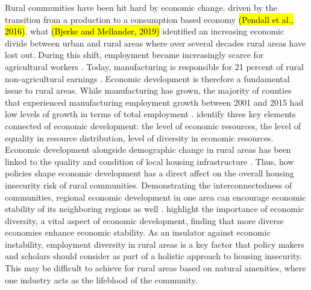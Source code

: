 Rural communities have been hit hard by economic change, driven by the transition from a production to a consumption based economy \hl{(Pendall et al., 2016)}. what \hl{(Bjerke and Mellander, 2019)} identified an increasing economic divide between urban and rural areas where over several decades rural areas have lost out. During this shift, employment became increasingly scarce for agricultural workers \citep{kropczynski_insights_2012}. Today, manufacturing is responsible for 21 percent of rural non-agricultural earnings \citep{low_rural_2017}. Economic development is therefore a fundamental issue to rural areas. While manufacturing has grown, the majority of counties that experienced manufacturing employment growth between 2001 and 2015 had low levels of growth in terms of total employment \citep{low_rural_2017}. \citet{sherrieb_measuring_2010} identify three key elements connected of economic development: the level of economic resources, the level of equality in resource distribution, level of diversity in economic resources. Economic development alongside demographic change in rural areas has been linked to the quality and condition of local housing infrastructure \citep{barcus_heterogeneity_2011}. Thus, how policies shape economic development has a direct affect on the overall housing insecurity risk of rural communities. Demonstrating the interconnectedness of communities, regional economic development in one area can encourage economic stability of its neighboring regions as well \citep{chen_economic_nodate}. \citet{deller_spatial_2016} highlight the importance of economic diversity, a vital aspect of economic development, finding that more diverse economies enhance economic stability. As an insulator against economic instability, employment diversity in rural areas is a key factor that policy makers and scholars should consider as part of a holistic approach to housing insecurity. This may be difficult to achieve for rural areas based on natural amenities, where one industry acts as the lifeblood of the community. 

 

